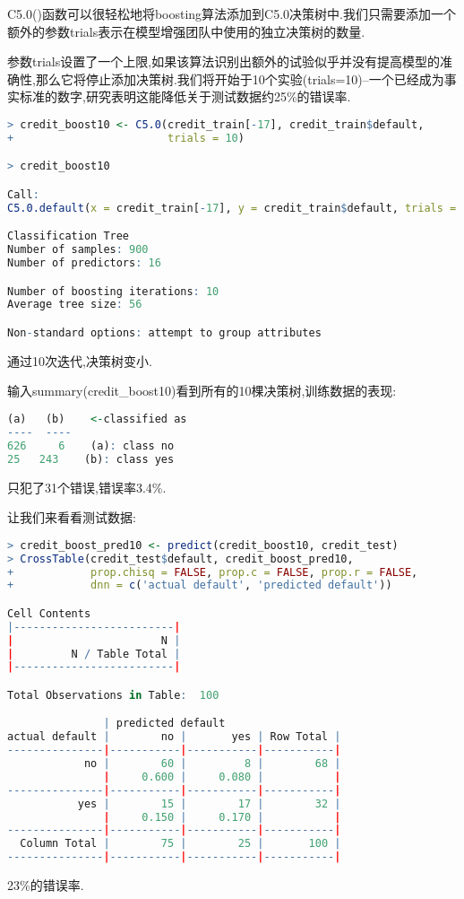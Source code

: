 \documentclass[11pt,a4paper,oneside]{book}
\begin{document}
C5.0()函数可以很轻松地将boosting算法添加到C5.0决策树中.我们只需要添加一个额外的参数trials表示在模型增强团队中使用的独立决策树的数量.

参数trials设置了一个上限,如果该算法识别出额外的试验似乎并没有提高模型的准确性,那么它将停止添加决策树.我们将开始于10个实验(trials=10)--一个已经成为事实标准的数字,研究表明这能降低关于测试数据约25\%的错误率.
\begin{lstlisting}[language=r]
> credit_boost10 <- C5.0(credit_train[-17], credit_train$default,
+                        trials = 10)

> credit_boost10

Call:
C5.0.default(x = credit_train[-17], y = credit_train$default, trials = 10)

Classification Tree
Number of samples: 900 
Number of predictors: 16 

Number of boosting iterations: 10 
Average tree size: 56 

Non-standard options: attempt to group attributes
\end{lstlisting}
通过10次迭代,决策树变小.

输入summary(credit\_boost10)看到所有的10棵决策树,训练数据的表现:
\begin{lstlisting}[language=r]
	   (a)   (b)    <-classified as
----  ----
626     6    (a): class no
25   243    (b): class yes
\end{lstlisting}
只犯了31个错误,错误率3.4\%.

让我们来看看测试数据:
\begin{lstlisting}[language=r]
> credit_boost_pred10 <- predict(credit_boost10, credit_test)
> CrossTable(credit_test$default, credit_boost_pred10,
+            prop.chisq = FALSE, prop.c = FALSE, prop.r = FALSE,
+            dnn = c('actual default', 'predicted default'))

Cell Contents
|-------------------------|
|                       N |
|         N / Table Total |
|-------------------------|

Total Observations in Table:  100 

               | predicted default 
actual default |        no |       yes | Row Total | 
---------------|-----------|-----------|-----------|
            no |        60 |         8 |        68 | 
               |     0.600 |     0.080 |           | 
---------------|-----------|-----------|-----------|
           yes |        15 |        17 |        32 | 
               |     0.150 |     0.170 |           | 
---------------|-----------|-----------|-----------|
  Column Total |        75 |        25 |       100 | 
---------------|-----------|-----------|-----------|
\end{lstlisting}
23\%的错误率.
\end{document}
